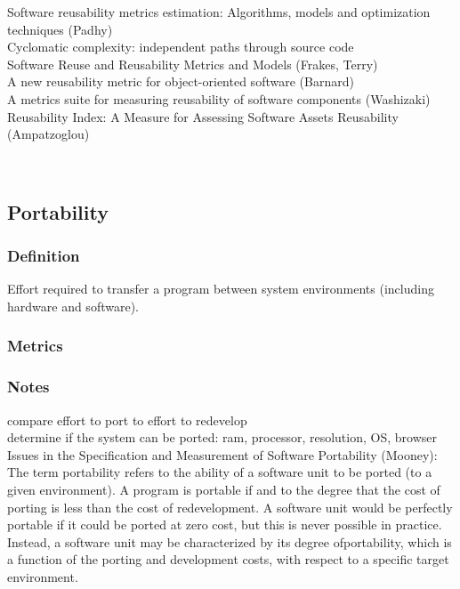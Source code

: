 \documentclass{article}
\begin{document}
Software reusability metrics estimation: Algorithms, models and optimization techniques (Padhy)\\ 

Cyclomatic complexity: independent paths through source code\\ 

Software Reuse and Reusability Metrics and Models (Frakes, Terry)\\ 

A new reusability metric for object-oriented software (Barnard)\\ 

A metrics suite for measuring reusability of software components (Washizaki)\\ 

Reusability Index: A Measure for Assessing Software Assets Reusability (Ampatzoglou) 

~\newpage
\subsection{Portability}
\subsubsection{Definition}
Effort required to transfer a program between system environments (including hardware and software).\\
\subsubsection{Metrics}
\subsubsection{Notes}
compare effort to port to effort to redevelop\\ 

determine if the system can be ported: ram, processor, resolution, OS, browser\\ 

Issues in the Specification and Measurement of Software Portability (Mooney):\\
The term portability
 refers to the ability of a software
 unit to be ported (to a given environment).
 A program is
 portable if and to the degree that the cost of porting is less than
 the cost of redevelopment. A software unit would be perfectly
 portable if it could be ported at zero cost, but this is never
 possible in practice.
 Instead, a software unit may be
 characterized by its degree ofportability,
 which is a function of
 the porting and development costs, with respect to a specific
 target environment.\\   
 
\end{document}

